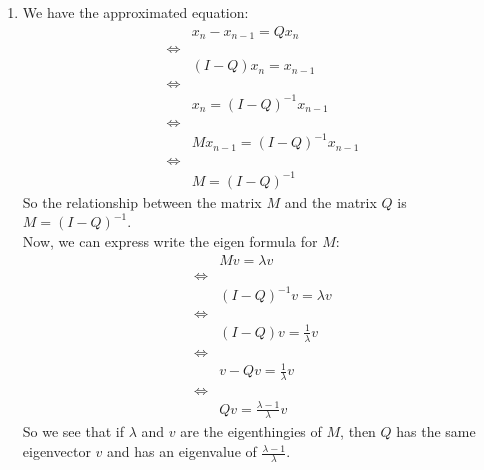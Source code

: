 \documentclass[11pt, legalpaper]{article}
\begin{document}
\begin{enumerate}
    \item We have the approximated equation:
    \begin{align*}
        &x_n-x_{n-1}=Qx_n\\
        \Longleftrightarrow & \\
        &(I-Q)x_n=x_{n-1}\\
        \Longleftrightarrow & \\
        &x_n=(I-Q)^{-1}x_{n-1} \\
        \Longleftrightarrow & \\
        &Mx_{n-1}=(I-Q)^{-1}x_{n-1}\\
        \Longleftrightarrow & \\
        &M=(I-Q)^{-1}
    \end{align*}
    So the relationship between the matrix $M$ and the matrix $Q$ is $ \boxed{M=(I-Q)^{-1}}$.\\
    Now, we can express write the eigen formula for $M$:
    \begin{align*}
        &Mv=\lambda v\\
        \Longleftrightarrow & \\
        &(I-Q)^{-1}v=\lambda v\\
        \Longleftrightarrow & \\
        &(I-Q)v=\frac{1}{\lambda}v\\
        \Longleftrightarrow& \\
        &v-Qv=\frac{1}{\lambda}v\\
        \Longleftrightarrow& \\
        &Qv=\frac{\lambda-1}{\lambda}v
    \end{align*}
    So we see that if $\lambda$ and $v$ are the eigenthingies of $M$, then $Q$ has the same eigenvector $v$ and has an eigenvalue of $\frac{\lambda-1}{\lambda}$.
    
    
\end{enumerate}
\end{document}
